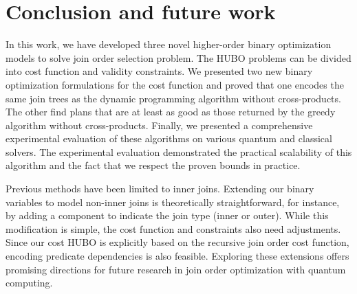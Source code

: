 \section{Conclusion and future work}

In this work, we have developed three novel higher-order binary optimization models to solve join order selection problem. The HUBO problems can be divided into cost function and validity constraints. We presented two new binary optimization formulations for the cost function and proved that one encodes the same join trees as the dynamic programming algorithm without cross-products. The other find plans that are at least as good as those returned by the greedy algorithm without cross-products. Finally, we presented a comprehensive experimental evaluation of these algorithms on various quantum and classical solvers. The experimental evaluation demonstrated the practical scalability of this algorithm and the fact that we respect the proven bounds in practice.

Previous methods have been limited to inner joins. Extending our binary variables to model non-inner joins is theoretically straightforward, for instance, by adding a component to indicate the join type (inner or outer). While this modification is simple, the cost function and constraints also need adjustments. Since our cost HUBO is explicitly based on the recursive join order cost function, encoding predicate dependencies is also feasible. Exploring these extensions offers promising directions for future research in join order optimization with quantum computing.





